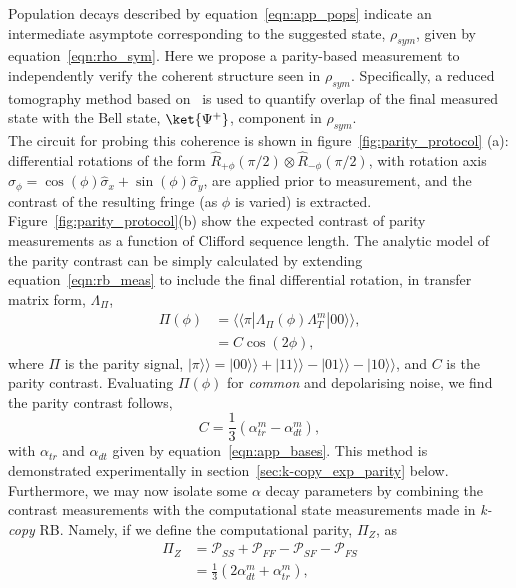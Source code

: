 Population decays described by equation~\ref{eqn:app_pops} indicate an intermediate asymptote corresponding to the suggested state, $\rho_{sym}$, given by equation~\ref{eqn:rho_sym}. Here we propose a parity-based
measurement to independently verify the coherent structure seen in $\rho_{sym}$.  
Specifically, a reduced tomography method based on~\cite{sackett_experimental_2000} is used to
quantify overlap of the final measured state with the Bell state, $\ket{\Psi^+}$, component in $\rho_{sym}$.\\
The circuit for probing this coherence is shown in figure~\ref{fig:parity_protocol} (a): differential rotations of the form $\hat R_{+\phi}(\pi/2) \otimes
\hat R_{-\phi}(\pi/2)$, with rotation axis $\hat\sigma_\phi=\cos(\phi)\hat\sigma_x + \sin(\phi)\hat\sigma_y$, are applied prior to measurement, and the contrast of the
resulting fringe (as $\phi$ is varied) is extracted. \\
Figure~\ref{fig:parity_protocol}(b) show the expected contrast of parity measurements as a function of Clifford sequence length. The analytic model of the parity contrast can be simply calculated by extending equation~\ref{eqn:rb_meas} to include the final differential rotation, in transfer matrix form, $\Lambda_\Pi$,
\begin{equation}\label{eqn:app_parcontrast}
\begin{split}
    \Pi(\phi)&=\langle\langle \pi|\Lambda_\Pi(\phi)\Lambda_T^m|00\rangle\rangle,\\
    &= C\cos(2\phi),
\end{split}
\end{equation}
where $\Pi$ is the parity signal, $|\pi\rangle\rangle=|00\rangle\rangle+|11\rangle\rangle-|01\rangle\rangle-|10\rangle\rangle$, and $C$ is the parity contrast.
Evaluating $\Pi(\phi)$ for \emph{common} and depolarising noise, we find the parity contrast follows,
\begin{equation}\label{eqn:parity_contrast}
    C=\frac{1}{3}(\alpha_{tr}^m-\alpha_{dt}^m),
\end{equation}
with $\alpha_{tr}$ and $\alpha_{dt}$ given by equation~\ref{eqn:app_bases}.
This method is demonstrated experimentally in section~\ref{sec:k-copy_exp_parity} below.
\\
Furthermore, we may now isolate some $\alpha$ decay parameters by 
combining the contrast measurements with the computational state measurements made in \emph{k-copy} RB. Namely, if we define the computational parity, $\Pi_Z$, as
\begin{equation}
\begin{split}
    \Pi_Z &= \mathcal{P}_{SS}+\mathcal{P}_{FF}-\mathcal{P}_{SF}-\mathcal{P}_{FS}\\
    &=\frac{1}{3}(2\alpha_{dt}^m+\alpha_{tr}^m),
\end{split}
\end{equation}
